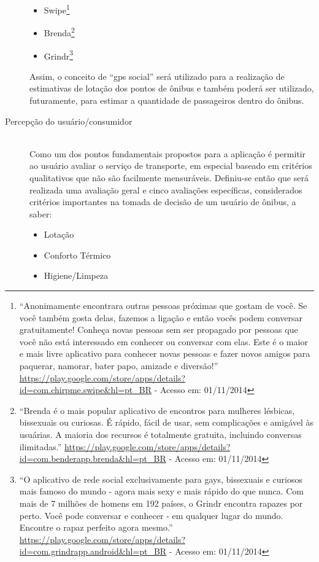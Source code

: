 \begin{description}
\begin{itemize}
%
        \item Swipe\footnote{``Anonimamente encontrara outras pessoas próximas que gostam de você. Se você também gosta delas, fazemos a ligação e então vocês podem conversar gratuitamente! Conheça novas pessoas sem ser propagado por pessoas que você não está interessado em conhecer ou conversar com elas. Este é o maior e mais livre aplicativo para conhecer novas pessoas e fazer novos amigos para paquerar, namorar, bater papo, amizade e diversão!'' {\url{https://play.google.com/store/apps/details?id=com.chirpme.swipe&hl=pt_BR}} - Acesso em: 01/11/2014}
%
        \item Brenda\footnote{``Brenda é o mais popular aplicativo de encontros para mulheres lésbicas, bissexuais ou curiosas. É rápido, fácil de usar, sem complicações e amigável às usuárias. A maioria dos recursos é totalmente gratuita, incluindo conversas ilimitadas.'' {\url{https://play.google.com/store/apps/details?id=com.benderapp.brenda&hl=pt_BR}} - Acesso em: 01/11/2014}
%
        \item Grindr\footnote{``O aplicativo de rede social exclusivamente para gays, bissexuais e curiosos mais famoso do mundo - agora mais sexy e mais rápido do que nunca. Com mais de 7 milhões de homens em 192 países, o Grindr encontra rapazes por perto. Você pode conversar e conhecer - em qualquer lugar do mundo. Encontre o rapaz perfeito agora mesmo.'' {\url{https://play.google.com/store/apps/details?id=com.grindrapp.android&hl=pt_BR}} - Acesso em: 01/11/2014}
%
	    \end{itemize}
	    Assim, o conceito de ``gps social'' será utilizado para a realização de estimativas de lotação dos pontos de ônibus e também poderá ser utilizado, futuramente, para estimar a quantidade de passageiros dentro do ônibus.%
%
	\item[Percepção do usuário/consumidor]\cite{Lai1995,Almeida2011,Almeida2007,andrade2008constructos} \hfill \\
	    Como um dos pontos fundamentais propostos para a aplicação é permitir ao usuário avaliar o serviço de transporte, em especial baseado em critérios qualitativos que não são facilmente mensuráveis. Definiu-se então que será realizada uma avaliação geral e cinco avaliações específicas, considerados critérios importantes na tomada de decisão de um usuário de ônibus, a saber:
	    \begin{itemize}
	    \item Lotação
	    \item Conforto Térmico
	    \item Higiene/Limpeza

\end{itemize}
\end{description}
